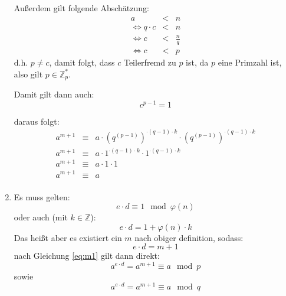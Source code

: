 \documentclass[DIN, pagenumber=false, fontsize=11pt, parskip=half]{scrartcl}
\begin{document}
\begin{enumerate}[label=(\roman*)]
            Außerdem gilt folgende Abschätzung:
            \begin{eqnarray}
                a &<& n \\
                \Leftrightarrow q \cdot c &<& n \\
                \Leftrightarrow c &<& \frac{n}{q} \\
                \Leftrightarrow c &<& p 
            \end{eqnarray}
            d.h. $p \neq c$, damit folgt, dass $c$ Teilerfremd zu $p$ ist,
            da $p$ eine Primzahl ist, also gilt $p \in \mathbb{Z}^*_p$.

            Damit gilt dann auch:
            \begin{equation}
                c^{p-1} = 1
            \end{equation} 

            daraus folgt:
            \begin{eqnarray}
                a^{m+1} &\equiv& a \cdot {\left(q^{(p-1)}\right)}^{\cdot(q-1)\cdot k} \cdot {\left(q^{(p-1)}\right)}^{\cdot(q-1)\cdot k} \\
                a^{m+1} &\equiv& a \cdot 1^{\cdot(q-1)\cdot k} \cdot 1^{\cdot(q-1)\cdot k} \\
                a^{m+1} &\equiv& a \cdot 1 \cdot 1 \\
                a^{m+1} &\equiv& a \label{eq:m1} \\
            \end{eqnarray}
        \item
            Es muss gelten:
            \begin{equation}
                e \cdot d \equiv 1 \mod \varphi(n)
            \end{equation}
            oder auch (mit $k \in \mathbb{Z}$):
            \begin{equation}
                e \cdot d = 1 + \varphi(n) \cdot k
            \end{equation} 
            Das heißt aber es existiert ein $m$ nach obiger definition, sodass:
            \begin{equation}
                e \cdot d = m + 1
            \end{equation}
            nach Gleichung \ref{eq:m1} gilt dann direkt:
            \begin{equation}
                a^{e \cdot d} = a^{m+1} \equiv a \mod p
            \end{equation} 
            sowie
            \begin{equation}
                a^{e \cdot d} = a^{m+1} \equiv a \mod q
            \end{equation} 


\end{enumerate}
\end{document}
